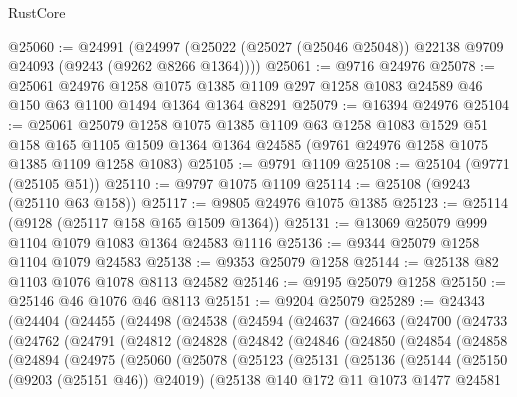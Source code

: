 \begin{lexlean}{RustCore}
\begin{coremodule}
@25060 := @24991
    (@24997 (@25022 (@25027 (@25046 @25048)) @22138 @9709 @24093 (@9243 (@9262 @8266 @1364))))
@25061 := @9716 @24976
@25078 := @25061
    @24976
    @1258
    @1075
    @1385
    @1109
    @297
    @1258
    @1083
    @24589
    @46
    @150
    @63
    @1100
    @1494
    @1364
    @1364
    @8291
@25079 := @16394 @24976
@25104 := @25061
    @25079
    @1258
    @1075
    @1385
    @1109
    @63
    @1258
    @1083
    @1529
    @51
    @158
    @165
    @1105
    @1509
    @1364
    @1364
    @24585
    (@9761 @24976 @1258 @1075 @1385 @1109 @1258 @1083)
@25105 := @9791 @1109
@25108 := @25104 (@9771 (@25105 @51))
@25110 := @9797 @1075 @1109
@25114 := @25108 (@9243 (@25110 @63 @158))
@25117 := @9805 @24976 @1075 @1385
@25123 := @25114 (@9128 (@25117 @158 @165 @1509 @1364))
@25131 := @13069 @25079 @999 @1104 @1079 @1083 @1364 @24583 @1116
@25136 := @9344 @25079 @1258 @1104 @1079 @24583
@25138 := @9353 @25079 @1258
@25144 := @25138 @82 @1103 @1076 @1078 @8113 @24582
@25146 := @9195 @25079 @1258
@25150 := @25146 @46 @1076 @46 @8113
@25151 := @9204 @25079
@25289 := @24343
    (@24404
      (@24455
        (@24498
          (@24538
            (@24594
              (@24637
                (@24663
                  (@24700
                    (@24733
                      (@24762
                        (@24791
                          (@24812
                            (@24828
                              (@24842
                                (@24846
                                  (@24850
                                    (@24854
                                      (@24858
                                        (@24894
                                          (@24975
                                            (@25060
                                              (@25078
                                                (@25123
                                                  (@25131
                                                    (@25136
                                                      (@25144
                                                        (@25150 (@9203 (@25151 @46)) @24019)
                                                        (@25138
                                                          @140
                                                          @172
                                                          @11
                                                          @1073
                                                          @1477
                                                          @24581

\end{coremodule}
\end{lexlean}
